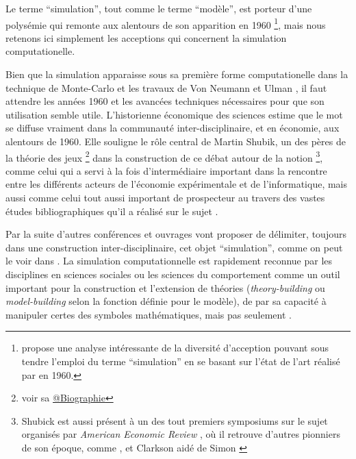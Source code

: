 Le terme \enquote{simulation}, tout comme le terme \enquote{modèle}, est porteur d'une polysémie qui remonte aux alentours de son apparition en 1960 \footnote{ \textcite[343-350]{Morgan2004} propose une analyse intéressante de la diversité d’acception pouvant sous tendre l'emploi du terme \enquote{simulation} en se basant sur l'état de l'art réalisé par \textcite{Shubik1960a} en 1960.}, mais nous retenons ici simplement les acceptions qui concernent la simulation computationelle. 

Bien que la simulation apparaisse sous sa première forme computationelle dans la technique de Monte-Carlo et les travaux de Von Neumann et Ulman \autocite{Eckhardt1987}, il faut attendre les années 1960 et les avancées techniques nécessaires pour que son utilisation semble utile. L'historienne économique des sciences \textcite{Morgan2004} estime que le mot se diffuse vraiment dans la communauté inter-disciplinaire, et en économie, aux alentours de 1960. Elle souligne le rôle central de Martin Shubik, un des pères de la théorie des jeux \footnote{voir sa \href{http://blogs.library.duke.edu/rubenstein/2012/12/18/the-martin-shubik-papers-from-early-game-theory-to-the-strategic-analysis-of-war/}{@Biographie}} dans la construction de ce débat autour de la notion \footnote{Shubick est aussi présent à un des tout premiers symposiums sur le sujet organisés par \textit{American Economic Review} \autocite{Shubik1960b}, où il retrouve d'autres pionniers de son époque, comme \textcite{Orcutt1960}, et Clarkson aidé de Simon \autocite{Clarkson1960}}, comme celui qui a servi à la fois d'intermédiaire important dans la rencontre entre les différents acteurs de l'économie expérimentale et de l'informatique, mais aussi comme celui tout aussi important de prospecteur au travers des vastes études bibliographiques qu'il a réalisé sur le sujet \autocite{Shubik1960a, Shubik1972} \autocite{Morgan2004}.

Par la suite d'autres conférences et ouvrages vont proposer de délimiter, toujours dans une construction inter-disciplinaire, cet objet \enquote{simulation}, comme on peut le voir dans \autocite{Guetzkow1962, Borko1962, Guetzkow1972, Dutton1971}. La simulation computationnelle est rapidement reconnue par les disciplines en sciences sociales ou les sciences du comportement comme un outil important pour la construction et l'extension de théories (\textit{theory-building} ou \textit{model-building} selon la fonction définie pour le modèle), de par sa capacité à manipuler certes des symboles mathématiques, mais pas seulement \autocite[924-325]{Clarkson1960}.

